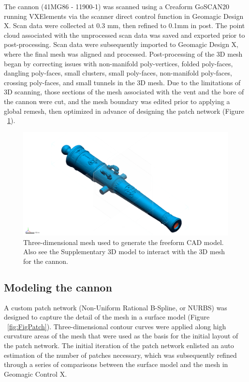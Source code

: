 \documentclass[review]{elsarticle}
\begin{document}
The cannon (41MG86 - 11900-1) was scanned using a Creaform GoSCAN20 running VXElements via the scanner direct control function in Geomagic Design X. Scan data were collected at 0.3 mm, then refined to 0.1mm in post. The point cloud associated with the unprocessed scan data was saved and exported prior to post-processing. Scan data were subsequently imported to Geomagic Design X, where the final mesh was aligned and processed. Post-processing of the 3D mesh began by correcting issues with non-manifold poly-vertices, folded poly-faces, dangling poly-faces, small clusters, small poly-faces, non-manifold poly-faces, crossing poly-faces, and small tunnels in the 3D mesh. Due to the limitations of 3D scanning, those sections of the mesh associated with the vent and the bore of the cannon were cut, and the mesh boundary was edited prior to applying a global remesh, then optimized in advance of designing the patch network (Figure ~\ref{fig:Fig2}).

\begin{figure}[ht]\centering
\includegraphics[width=\linewidth]{FigLSC2}
\caption{Three-dimensional mesh used to generate the freeform CAD model. Also see the Supplementary 3D model to interact with the 3D mesh for the cannon.}
\label{fig:Fig2}
\end{figure}

\subsection*{Modeling the cannon}

A custom patch network (Non-Uniform Rational B-Spline, or NURBS) was designed to capture the detail of the mesh in a surface model (Figure ~\ref{fig:FigPatch}). Three-dimensional contour curves were applied along high curvature areas of the mesh that were used as the basis for the initial layout of the patch network. The initial iteration of the patch network enlisted an auto estimation of the number of patches necessary, which was subsequently refined through a series of comparisons between the surface model and the mesh in Geomagic Control X.
\end{document}
